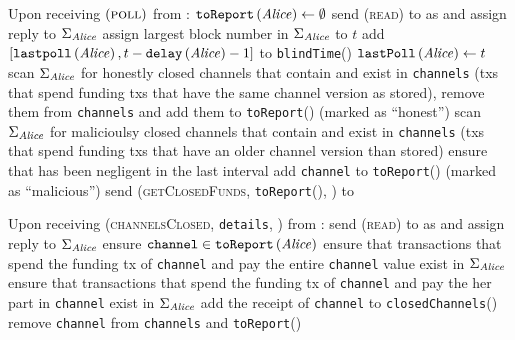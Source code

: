 \begin{functionality}{\fpaynet}
\begin{algorithmic}[1]
    \State Upon receiving $\left(\textsc{poll}\right)$ from \alice:
    \Indent
      \State $\mathtt{toReport}\left(\mathit{Alice}\right) \gets \emptyset$
      \State send (\textsc{read}) to \ledger{} as \alice{} and assign reply to
      $\Sigma_{\mathit{Alice}}$
      \State assign largest block number in $\Sigma_{\mathit{Alice}}$ to $t$
        \State add $\left[\mathtt{lastpoll}\left(\mathit{Alice}\right), t -
        \texttt{delay}\left(\mathit{Alice}\right) - 1\right]$ to
        \texttt{blindTime}(\alice)
      \EndIf
      \State $\mathtt{lastPoll}\left(\mathit{Alice}\right) \gets t$
      \State scan $\Sigma_{\mathit{Alice}}$ for honestly closed channels that contain
      \alice{} and exist in \texttt{channels} (txs that spend funding txs that
      have the same channel version as stored), remove them from
      \texttt{channels} and add them to \texttt{toReport}(\alice) (marked as
      ``honest'')
      \State scan $\Sigma_{\mathit{Alice}}$ for malicioulsy closed channels that contain
      \alice{} and exist in \texttt{channels} (txs that spend funding txs that
      have an older channel version than stored)
       
          \State ensure that \alice{} has been negligent in the last interval
        \EndIf
        \State add \texttt{channel} to \texttt{toReport}(\alice) (marked as
        ``malicious'')
      \EndFor
      \State send (\textsc{getClosedFunds}, \texttt{toReport}(\alice), \alice)
      to \simulator
    \EndIndent
    \State

    \State Upon receiving (\textsc{channelsClosed}, \texttt{details}, \alice)
    from \simulator:
    \Indent
      \State send (\textsc{read}) to \ledger{} as \alice{} and assign reply to
      $\Sigma_{\mathit{Alice}}$
        \State ensure $\mathtt{channel} \in
        \mathtt{toReport}\left(\mathit{Alice}\right)$
          \State ensure that transactions that spend the funding tx of
          \texttt{channel} and pay \alice{} the entire \texttt{channel} value
          exist in $\Sigma_{\mathit{Alice}}$
        \Else {}
          \State ensure that transactions that spend the funding tx of
          \texttt{channel} and pay \alice{} the her part in \texttt{channel}
          exist in $\Sigma_{\mathit{Alice}}$
        \EndIf
        \State add the receipt of \texttt{channel} to
        \texttt{closedChannels}(\alice)
        \State remove \texttt{channel} from \texttt{channels} and
        \texttt{toReport}(\alice)
      \EndFor
    \EndIndent
    \State


\end{algorithmic}
\end{functionality}
